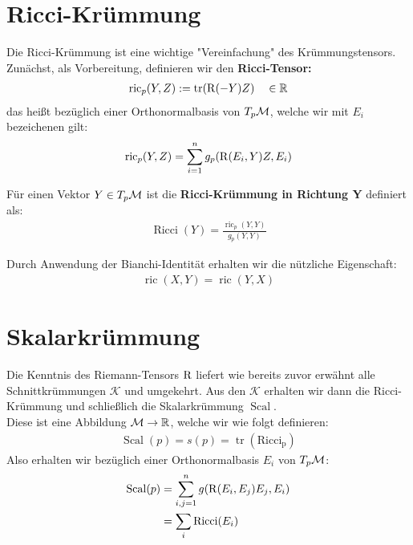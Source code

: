 \section{Ricci-Krümmung}
Die Ricci-Krümmung ist eine wichtige "Vereinfachung" des Krümmungstensors. \\
Zunächst, als Vorbereitung, definieren wir den \textbf{Ricci-Tensor:}
\begin{align}
	\operatorname{ric}_p(Y,Z) := \operatorname{tr}(\operatorname{R}(-Y)Z) \quad \in \mathbb{R}
\end{align}
das heißt bezüglich einer Orthonormalbasis von $T_p\mathcal{M}$, welche wir mit $E_i$ bezeichenen gilt: 
\begin{align}
	\operatorname{ric}_p(Y,Z) = \sum_{i=1}^{n} g_p(\operatorname{R}(E_i,Y)Z,E_i)
\end{align}
\begin{defs}
	Für einen Vektor $Y \in T_p\mathcal{M}$ ist die \textbf{Ricci-Krümmung in Richtung Y} definiert als:
	\begin{align}
		\operatorname{Ricci}(Y) = \frac{\operatorname{ric}_p(Y,Y)}{g_p(Y,Y)}
	\end{align} 
\end{defs}
Durch Anwendung der Bianchi-Identität erhalten wir die nützliche Eigenschaft: 
\begin{align}
	\operatorname{ric}(X,Y) = \operatorname{ric}(Y,X)
\end{align}
\section{Skalarkrümmung}
Die Kenntnis des Riemann-Tensors $\operatorname{R}$ liefert 
wie bereits zuvor erwähnt alle Schnittkrümmungen $\mathcal{K}$ und umgekehrt. Aus den $\mathcal{K}$ erhalten wir dann die Ricci-Krümmung und schließlich die Skalarkrümmung $\operatorname{Scal}$. \\
Diese ist eine Abbildung $\mathcal{M} \rightarrow \mathbb{R}$, welche wir wie folgt definieren:
\begin{align}
	\operatorname{Scal}(p) = s(p) = \operatorname{tr}(\operatorname{Ricci_p}) 
\end{align} 
Also erhalten wir bezüglich einer Orthonormalbasis $E_i$ von $T_p\mathcal{M}$:
\begin{align}
	\operatorname{Scal}(p) &= \sum_{i,j = 1}^{n}g(\operatorname{R}(E_i,E_j)E_j,E_i) \nonumber \\
	&= \sum_{i}\operatorname{Ricci}(E_i)
\end{align}